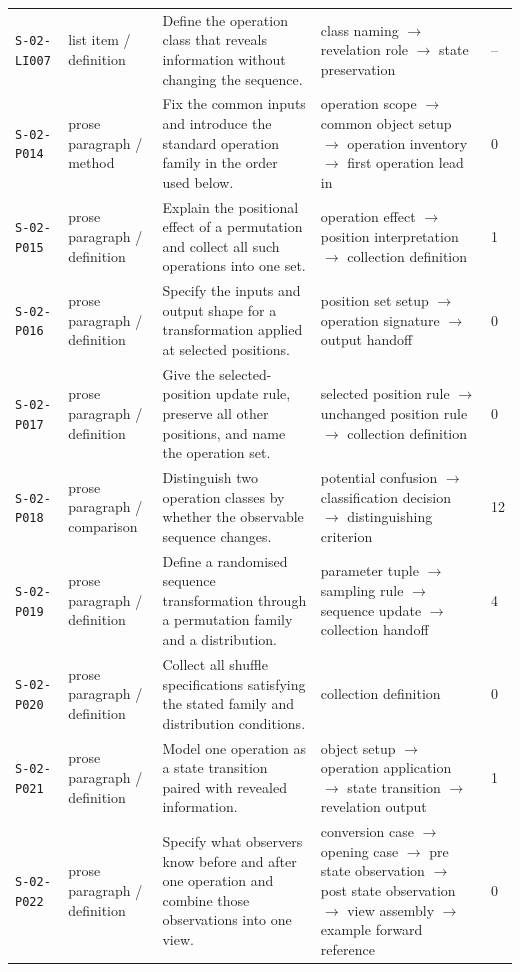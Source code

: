 \documentclass[10pt]{article}
\begin{document}
\begin{longtable}{@{}p{}p{}p{}p{}p{}@{}}
\texttt{S-02-LI007}&list item / definition&Define the operation class that reveals information without changing the sequence.&class naming $\rightarrow$ revelation role $\rightarrow$ state preservation&--\\
\texttt{S-02-P014}&prose paragraph / method&Fix the common inputs and introduce the standard operation family in the order used below.&operation scope $\rightarrow$ common object setup $\rightarrow$ operation inventory $\rightarrow$ first operation lead in&0\\
\texttt{S-02-P015}&prose paragraph / definition&Explain the positional effect of a permutation and collect all such operations into one set.&operation effect $\rightarrow$ position interpretation $\rightarrow$ collection definition&1\\
\texttt{S-02-P016}&prose paragraph / definition&Specify the inputs and output shape for a transformation applied at selected positions.&position set setup $\rightarrow$ operation signature $\rightarrow$ output handoff&0\\
\texttt{S-02-P017}&prose paragraph / definition&Give the selected-position update rule, preserve all other positions, and name the operation set.&selected position rule $\rightarrow$ unchanged position rule $\rightarrow$ collection definition&0\\
\texttt{S-02-P018}&prose paragraph / comparison&Distinguish two operation classes by whether the observable sequence changes.&potential confusion $\rightarrow$ classification decision $\rightarrow$ distinguishing criterion&12\\
\texttt{S-02-P019}&prose paragraph / definition&Define a randomised sequence transformation through a permutation family and a distribution.&parameter tuple $\rightarrow$ sampling rule $\rightarrow$ sequence update $\rightarrow$ collection handoff&4\\
\texttt{S-02-P020}&prose paragraph / definition&Collect all shuffle specifications satisfying the stated family and distribution conditions.&collection definition&0\\
\texttt{S-02-P021}&prose paragraph / definition&Model one operation as a state transition paired with revealed information.&object setup $\rightarrow$ operation application $\rightarrow$ state transition $\rightarrow$ revelation output&1\\
\texttt{S-02-P022}&prose paragraph / definition&Specify what observers know before and after one operation and combine those observations into one view.&conversion case $\rightarrow$ opening case $\rightarrow$ pre state observation $\rightarrow$ post state observation $\rightarrow$ view assembly $\rightarrow$ example forward reference&0\\

\end{longtable}
\end{document}
